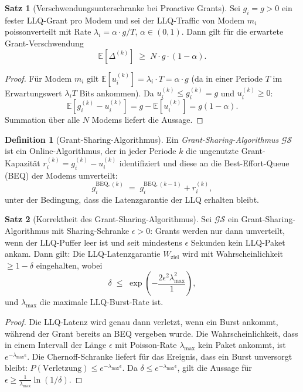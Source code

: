 ﻿\documentclass[a4paper,12pt]{article}
\theoremstyle{definition}
\newtheorem{definition}{Definition}
\newtheorem{satz}{Satz}
\begin{document}
\begin{satz}[Verschwendungsunterschranke bei Proactive Grants]
    \label{satz:waste}
    Sei $g_i = g > 0$ ein fester LLQ-Grant pro Modem und sei der LLQ-Traffic
    von Modem $m_i$ poissonverteilt mit Rate $\lambda_i = \alpha \cdot g/T$,
    $\alpha \in (0,1)$. Dann gilt f\"{u}r die erwartete Grant-Verschwendung
    \[
        \mathbb{E}[\Delta^{(k)}] \;\geq\; N \cdot g \cdot (1 - \alpha).
    \]
\end{satz}

\begin{proof}
    F\"{u}r Modem $m_i$ gilt $\mathbb{E}[u_i^{(k)}] = \lambda_i \cdot T = \alpha \cdot g$
    (da in einer Periode $T$ im Erwartungswert $\lambda_i T$ Bits ankommen).
    Da $u_i^{(k)} \leq g_i^{(k)} = g$ und $u_i^{(k)} \geq 0$:
    \[
        \mathbb{E}[g_i^{(k)} - u_i^{(k)}] = g - \mathbb{E}[u_i^{(k)}] = g(1 - \alpha).
    \]
    Summation \"{u}ber alle $N$ Modems liefert die Aussage.
\end{proof}

\begin{definition}[Grant-Sharing-Algorithmus]
    Ein \emph{Grant-Sharing-Algorithmus} $\mathcal{GS}$ ist ein Online-Algorithmus,
    der in jeder Periode $k$ die ungenutzte Grant-Kapazit\"{a}t
    $r_i^{(k)} = g_i^{(k)} - u_i^{(k)}$ identifiziert und diese an die
    Best-Effort-Queue (BEQ) der Modems umverteilt:
    \[
        g_i^{\mathrm{BEQ},(k)} \;=\; g_i^{\mathrm{BEQ},(k-1)} + r_i^{(k)},
    \]
    unter der Bedingung, dass die Latenzgarantie der LLQ erhalten bleibt.
\end{definition}

\begin{satz}[Korrektheit des Grant-Sharing-Algorithmus]
    \label{satz:grantsharing}
    Sei $\mathcal{GS}$ ein Grant-Sharing-Algorithmus mit Sharing-Schranke
    $\epsilon > 0$: Grants werden nur dann umverteilt, wenn der LLQ-Puffer
    leer ist und seit mindestens $\epsilon$ Sekunden kein LLQ-Paket ankam.
    Dann gilt: Die LLQ-Latenzgarantie $W_{\mathrm{ziel}}$ wird mit
    Wahrscheinlichkeit $\geq 1 - \delta$ eingehalten, wobei
    \[
        \delta \;\leq\; \exp\!\left(-\frac{2\epsilon^2\lambda_{\max}^2}{1}\right),
    \]
    und $\lambda_{\max}$ die maximale LLQ-Burst-Rate ist.
\end{satz}

\begin{proof}
    Die LLQ-Latenz wird genau dann verletzt, wenn ein Burst ankommt, w\"{a}hrend
    der Grant bereits an BEQ vergeben wurde. Die Wahrscheinlichkeit, dass in einem
    Intervall der L\"{a}nge $\epsilon$ mit Poisson-Rate $\lambda_{\max}$ kein Paket
    ankommt, ist $e^{-\lambda_{\max}\epsilon}$. Die Chernoff-Schranke liefert
    f\"{u}r das Ereignis, dass ein Burst unversorgt bleibt:
    $P(\text{Verletzung}) \leq e^{-\lambda_{\max}\epsilon}$.
    Da $\delta \leq e^{-\lambda_{\max}\epsilon}$, gilt die Aussage f\"{u}r
    $\epsilon \geq \frac{1}{\lambda_{\max}}\ln(1/\delta)$.
\end{proof}
\end{document}
